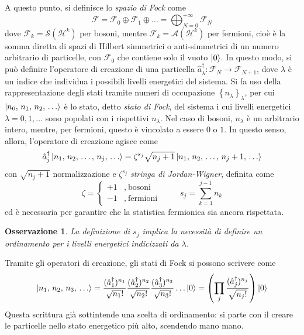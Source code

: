 \documentclass[11pt, a4paper]{scrartcl}
\theoremstyle{style}
\newtheorem{osservazione}{Osservazione}[section]
\theoremstyle{style1}
\numberwithin{equation}{subsection}
\begin{document}
A questo punto, si definisce lo \textit{spazio di Fock} come
\[
\mathcal{F} = \mathcal{F} _0 \oplus \mathcal{F} _1 \oplus \ldots = \bigoplus_{N=0} ^{+\infty} \mathcal{F} _N
\] 
dove $\mathcal{F} _k = \mathcal{S} (\mathcal{H} ^k)$ per bosoni, mentre $\mathcal{F} _k = \mathcal{A} (\mathcal{H} ^k)$ per fermioni, cio\`e \`e la somma diretta di spazi di Hilbert simmetrici o anti-simmetrici di un numero arbitrario di particelle, con $\mathcal{F} _0$ che contiene solo il vuoto $\ket{0} $.
In questo modo, si pu\`o definire l'operatore di creazione di una particella $\hat{a}^\dagger _\lambda : \mathcal{F} _N \to \mathcal{F} _{N+1} $, dove $\lambda $ \`e un indice che individua i possibili livelli energetici del sistema.
Si fa uso della rappresentazione degli stati tramite numeri di occupazione $\left\{ n_\lambda  \right\} _{\lambda} $, per cui $\ket{n_0,\, n_1 ,\, n_2,\,\ldots} $ \`e lo stato, detto \textit{stato di Fock}, del sistema i cui livelli energetici $\lambda =0,1,\ldots$ sono popolati con i rispettivi $n_\lambda $.
Nel caso di bosoni, $n_\lambda $ \`e un arbitrario intero, mentre, per fermioni, questo \`e vincolato a essere $0$ o $1$.
In questo senso, allora, l'operatore di creazione agisce come
\[
\hat{a}^\dagger _j \ket{n_1,\, n_2 ,\, \ldots ,\, n_j,\, \ldots} =\zeta^{s_j}\sqrt{n_j+1}  \ket{n_1,\, n_2 ,\, \ldots ,\, n_{j}+1 ,\, \ldots}
\] 
con $\sqrt{n_j+1} $ normalizzazione e $\zeta^{s_j} $ \textit{stringa di Jordan-Wigner}, definita come
\[
\zeta  = \begin{cases}
	+1 &,\ \text{bosoni}\\
	-1 &,\ \text{fermioni}
\end{cases} \hspace{1cm}s_j  =\sum_{k=1}^{j-1} n_k
\] 
ed \`e necessaria per garantire che la statistica fermionica sia ancora rispettata.
\begin{osservazione}
La definizione di $s_j$ implica la necessit\`a di definire un ordinamento per i livelli energetici indicizzati da $\lambda $.
\end{osservazione}
\noindent Tramite gli operatori di creazione, gli stati di Fock si possono scrivere come
\[
\ket{n_1,\, n_2,\, n_3,\, \ldots} = \frac{(\hat{a}^\dagger _1) ^{n_1} }{\sqrt{n_1} !}\frac{(\hat{a}^\dagger _2) ^{n_2} }{\sqrt{n_2} !}\frac{(\hat{a}^\dagger _3) ^{n_3} }{\sqrt{n_3} !}\ldots \ket{0}  = \left(\prod_j \frac{(\hat{a}^\dagger _j)^{n_j} }{\sqrt{n_j!} }\right) \ket{0} 
\] 
Questa scrittura gi\`a sottintende una scelta di ordinamento: si parte con il creare le particelle nello stato energetico pi\`u alto, scendendo mano mano.
\end{document}
